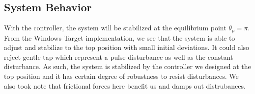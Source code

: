 \subsection{System Behavior}
With the controller, the system will be stabilized at the equilibrium point $\theta_p= \pi$. From the Windows Target implementation, we see that the system is able to adjust and stabilize to the top position with small initial deviations. It could also reject gentle tap which represent a pulse disturbance as well as the constant disturbance. As such, the system is stabilized by the controller we designed at the top position and it has certain degree of robustness to resist disturbances. We also took note that frictional forces here benefit us and damps out distrubances.